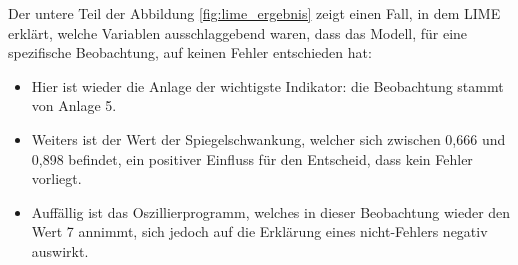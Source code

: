\documentclass[12pt,titlepage,oneside]{book}
\begin{document}
Der untere Teil der Abbildung \ref{fig:lime_ergebnis} zeigt einen Fall, in dem LIME erklärt, welche Variablen ausschlaggebend waren, dass das Modell, für eine spezifische Beobachtung, auf keinen Fehler entschieden hat:
\begin{itemize}
    \item Hier ist wieder die Anlage der wichtigste Indikator: die Beobachtung stammt von Anlage 5.
    \item  Weiters ist der Wert der Spiegelschwankung, welcher sich zwischen 0,666 und 0,898 befindet, ein positiver Einfluss für den Entscheid, dass kein Fehler vorliegt.
    \item Auffällig ist das Oszillierprogramm, welches in dieser Beobachtung wieder den Wert 7 annimmt, sich jedoch auf die Erklärung eines nicht-Fehlers negativ auswirkt.
\end{itemize}


\newpage
\end{document}
